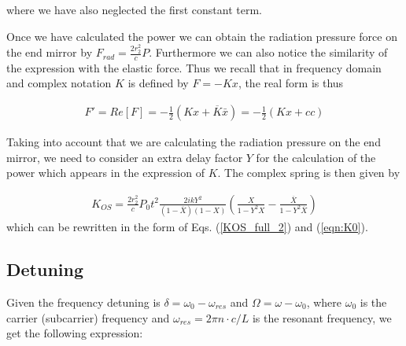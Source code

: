 where we have also neglected the first constant term.

Once we have calculated the power we can obtain the radiation pressure force on the end mirror by $F_{rad}=\frac{2 r_2^2}{c}P$. Furthermore
we can also notice the similarity of the expression with the elastic force. Thus we recall that
in frequency domain and complex notation $K$ is defined by $F=-Kx$, the real form is thus

\begin{align*}
F'=Re[F]=-\frac{1}{2}(Kx+\overline{K}\bar{x})=-\frac{1}{2}(Kx+cc)
\end{align*}

Taking into account that we are calculating the radiation pressure on the end mirror, we need to consider an extra delay factor $Y$
for the calculation of the power which appears in the expression of $K$. The complex spring is then given by 

\begin{align*}
K_{OS}=\frac{2 r_2^2}{c} P_0 t^2  \frac{2ikY^2}{(1-\overline{X})(1-X)} \left( \frac{X}{1-Y^2 X}-\frac{\overline{X}}{1-Y^2\overline{X}} \right) 
\end{align*}
which can be rewritten in the form of Eqs. (\ref{KOS_full_2}) and (\ref{eqn:K0}).


\subsection{Detuning}
Given the frequency detuning is $\delta=\omega_0-\omega_{res}$ and $\Omega=\omega-\omega_0$,
where $\omega_0$ is the carrier (subcarrier) frequency and $\omega_{res}=2\pi n\cdot c/L$ is the resonant frequency, we get the following expression:

%

